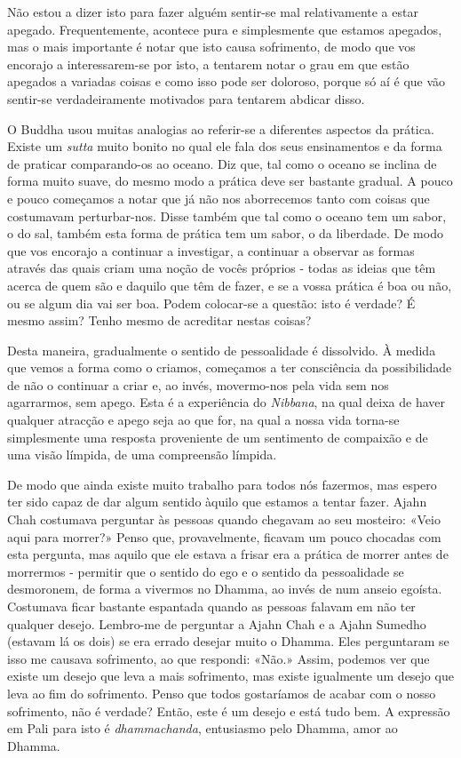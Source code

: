 Não estou a dizer isto para fazer alguém sentir-se mal relativamente a
estar apegado. Frequentemente, acontece pura e simplesmente que estamos
apegados, mas o mais importante é notar que isto causa sofrimento, de
modo que vos encorajo a interessarem-se por isto, a tentarem notar o
grau em que estão apegados a variadas coisas e como isso pode ser
doloroso, porque só aí é que vão sentir-se verdadeiramente motivados
para tentarem abdicar disso.

O Buddha usou muitas analogias ao referir-se a diferentes aspectos da
prática. Existe um \emph{sutta} muito bonito no qual ele fala dos seus
ensinamentos e da forma de praticar comparando-os ao oceano. Diz que,
tal como o oceano se inclina de forma muito suave, do mesmo modo a
prática deve ser bastante gradual. A pouco e pouco começamos a notar que
já não nos aborrecemos tanto com coisas que costumavam perturbar-nos.
Disse também que tal como o oceano tem um sabor, o do sal, também esta
forma de prática tem um sabor, o da liberdade. De modo que vos encorajo
a continuar a investigar, a continuar a observar as formas através das
quais criam uma noção de vocês próprios - todas as ideias que têm acerca
de quem são e daquilo que têm de fazer, e se a vossa prática é boa ou
não, ou se algum dia vai ser boa. Podem colocar-se a questão: isto é
verdade? É mesmo assim? Tenho mesmo de acreditar nestas coisas?

Desta maneira, gradualmente o sentido de pessoalidade é dissolvido. À
medida que vemos a forma como o criamos, começamos a ter consciência da
possibilidade de não o continuar a criar e, ao invés, movermo-nos pela
vida sem nos agarrarmos, sem apego. Esta é a experiência do
\emph{Nibbana}, na qual deixa de haver qualquer atracção e apego seja ao
que for, na qual a nossa vida torna-se simplesmente uma resposta
proveniente de um sentimento de compaixão e de uma visão límpida, de uma
compreensão límpida.

De modo que ainda existe muito trabalho para todos nós fazermos, mas
espero ter sido capaz de dar algum sentido àquilo que estamos a tentar
fazer. Ajahn Chah costumava perguntar às pessoas quando chegavam ao seu
mosteiro: «Veio aqui para morrer?» Penso que, provavelmente, ficavam um
pouco chocadas com esta pergunta, mas aquilo que ele estava a frisar era
a prática de morrer antes de morrermos - permitir que o sentido do ego e
o sentido da pessoalidade se desmoronem, de forma a vivermos no Dhamma,
ao invés de num anseio egoísta. Costumava ficar bastante espantada
quando as pessoas falavam em não ter qualquer desejo. Lembro-me de
perguntar a Ajahn Chah e a Ajahn Sumedho (estavam lá os dois) se era
errado desejar muito o Dhamma. Eles perguntaram se isso me causava
sofrimento, ao que respondi: «Não.» Assim, podemos ver que existe um
desejo que leva a mais sofrimento, mas existe igualmente um desejo que
leva ao fim do sofrimento. Penso que todos gostaríamos de acabar com o
nosso sofrimento, não é verdade? Então, este é um desejo e está tudo
bem. A expressão em Pali para isto é \emph{dhammachanda}, entusiasmo
pelo Dhamma, amor ao Dhamma.

